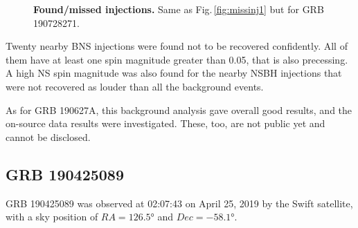 \documentclass[binding=0.6cm, LaM]{sapthesis}
\begin{document}
        \begin{figure}[!t]
          \noindent
          \label{missinj2_3}
          \centering
          \caption{\textbf{Found/missed injections.} Same as Fig.\,\ref{fig:missinj1} but for GRB 190728271.}
          \label{fig:missinj2_3}
        \end{figure}
	Twenty nearby BNS injections were found not to be recovered confidently.
	All of them have at least one spin magnitude greater than 0.05, that is also precessing.  A high NS spin magnitude was also found for the nearby NSBH injections that were not recovered as louder than all the background events.

        As for GRB 190627A, this background analysis gave overall good results,
	and the on-source data results were investigated.
	These, too, are not public yet and cannot be disclosed.

\subsection{GRB 190425089}
        GRB 190425089 was observed at 02:07:43 on April 25, 2019 by the Swift satellite,
        with a sky position of $RA=\ang{126.5}$ and $Dec=\ang{-58.1}$.
\end{document}
